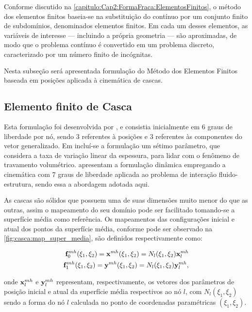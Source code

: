 Conforme discutido na \autoref{capitulo:Cap2:FormaFraca:ElementosFinitos}, o método dos elementos finitos baseia-se na substituição do contínuo por um conjunto finito de subdomínios, denominados elementos finitos. Em cada um desses elementos, as variáveis de interesse — incluindo a própria geometria — são aproximadas, de modo que o problema contínuo é convertido em um problema discreto, caracterizado por um número finito de incógnitas.

Nesta subseção será apresentada formulação do Método dos Elementos Finitos baseada em posições aplicada à cinemática de cascas.

\subsection{Elemento finito de Casca} \label{capitulo:Cap4:Mef:Casca}

Esta formulação foi desenvolvida por , e consistia inicialmente em 6 graus de liberdade por nó, sendo 3 referentes à posições e 3 referentes às componentes do vetor generalizado. Em  incluí-se a formulação um sétimo parâmetro, que considera a taxa de variação linear da espessura, para lidar com o fenômeno de travamento volumétrico.  apresentam a formulação dinâmica empregando a cinemática com 7 graus de liberdade  aplicada ao problema de interação fluido-estrutura, sendo essa a abordagem adotada aqui.

As cascas são sólidos que possuem uma de suas dimensões muito menor do que as outras, assim o mapeamento do seu domínio pode ser facilitado tomando-se a superfície média como referência. Os mapeamentos das configurações inicial e atual dos pontos da superfície média, conforme pode ser observado na \autoref{fig:casca:map_super_media}, são definidos respectivamente como:

\begin{align}
\mathbf{f}^{mh}_{0}(\xi_{1},\xi_{2}) = \mathbf{x}^{mh}(\xi_{1},\xi_{2}) = N_{l} (\xi_{1},\xi_{2}) \mathbf{x}_{l}^{mh}\label{eq:casca_Lposition_m}\\
\mathbf{f}^{mh}_{1}(\xi_{1},\xi_{2}) = \mathbf{y}^{mh}(\xi_{1},\xi_{2}) = N_{l} (\xi_{1},\xi_{2}) \mathbf{y}_{l}^{mh}, \label{eq:casca_Eposition_m}
\end{align}

\noindent onde $\mathbf{x}_{l}^{mh}$ e $\mathbf{y}_{l}^{mh}$ representam, respectivamente, os vetores dos parâmetros de posição inicial e atual da superfície média respectivos ao nó $l$, com $N_{l} (\xi_{1},\xi_{2})$ sendo a forma do nó $l$ calculada no ponto de coordenadas paramétricas $(\xi_{1},\xi_{2})$.

